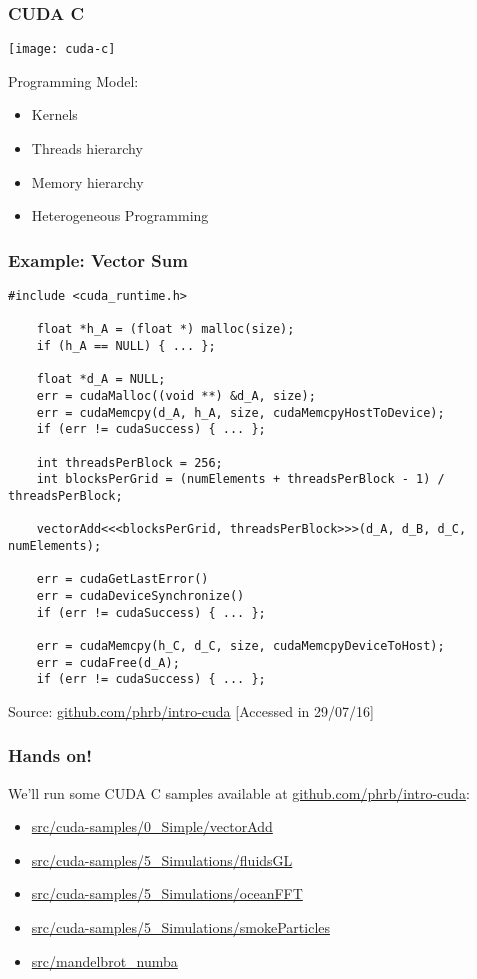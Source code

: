 \documentclass[10pt, compress]{beamer}
\begin{document}
\begin{frame}
    \frametitle{CUDA C}
    \begin{center}
        \texttt{[image: cuda-c]}
    \end{center}

    Programming Model:

    \begin{itemize}
        \item \alert{Kernels}
        \item \alert{Threads} hierarchy
        \item \alert{Memory} hierarchy
        \item \alert{Heterogeneous} Programming
    \end{itemize}
\end{frame}

\begin{frame}[fragile]
    \frametitle{Example: Vector Sum}
    \begin{lstlisting}[basicstyle=\ttfamily\scriptsize]
    #include <cuda_runtime.h>

    float *h_A = (float *) malloc(size);
    if (h_A == NULL) { ... };

    float *d_A = NULL;
    err = cudaMalloc((void **) &d_A, size);
    err = cudaMemcpy(d_A, h_A, size, cudaMemcpyHostToDevice);
    if (err != cudaSuccess) { ... };

    int threadsPerBlock = 256;
    int blocksPerGrid = (numElements + threadsPerBlock - 1) / threadsPerBlock;

    vectorAdd<<<blocksPerGrid, threadsPerBlock>>>(d_A, d_B, d_C, numElements);

    err = cudaGetLastError()
    err = cudaDeviceSynchronize()
    if (err != cudaSuccess) { ... };

    err = cudaMemcpy(h_C, d_C, size, cudaMemcpyDeviceToHost);
    err = cudaFree(d_A);
    if (err != cudaSuccess) { ... };
    \end{lstlisting}

    \vfill

    \begin{center}
        \tiny{Source: \url{github.com/phrb/intro-cuda} [Accessed in 29/07/16]}
    \end{center}
\end{frame}

\begin{frame}
    \frametitle{Hands on!}
    We'll run some CUDA C samples available at
    \url{github.com/phrb/intro-cuda}:
    \begin{itemize}
        \item \url{src/cuda-samples/0_Simple/vectorAdd}
        \item \url{src/cuda-samples/5_Simulations/fluidsGL}
        \item \url{src/cuda-samples/5_Simulations/oceanFFT}
        \item \url{src/cuda-samples/5_Simulations/smokeParticles}
        \item \url{src/mandelbrot_numba}
    \end{itemize}
\end{frame}
\end{document}
